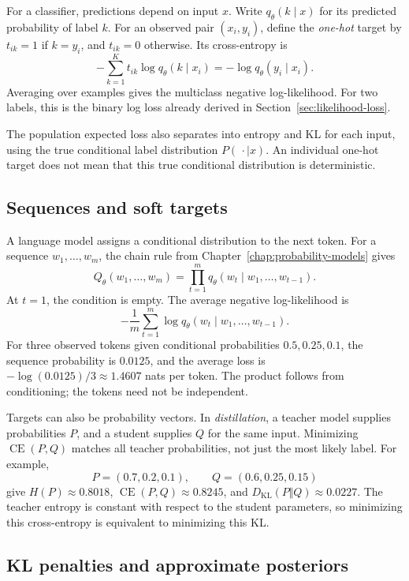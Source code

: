 For a classifier, predictions depend on input \(x\). Write \(q_\theta(k\mid x)\)
for its predicted probability of label \(k\).
For an observed pair \((x_i,y_i)\), define the \emph{one-hot} target by
\(t_{ik}=1\) if \(k=y_i\), and \(t_{ik}=0\) otherwise. Its cross-entropy is
\[
  -\sum_{k=1}^K t_{ik}\log q_\theta(k\mid x_i)
  =-\log q_\theta(y_i\mid x_i).
\]
Averaging over examples gives the multiclass negative log-likelihood.
For two labels, this is the binary log loss already derived in
Section~\ref{sec:likelihood-loss}.

The population expected loss also separates into entropy and KL for each
input, using the true conditional label distribution \(P(\,\cdot\mid x)\).
An individual one-hot target does not mean that this true conditional
distribution is deterministic.

\subsection{Sequences and soft targets}

A language model assigns a conditional distribution to the next token.
For a sequence \(w_1,\ldots,w_m\), the chain rule from
Chapter~\ref{chap:probability-models} gives
\[
  Q_\theta(w_1,\ldots,w_m)
  =\prod_{t=1}^m q_\theta(w_t\mid w_1,\ldots,w_{t-1}).
\]
At \(t=1\), the condition is empty. The average negative log-likelihood is
\[
  -\frac1m\sum_{t=1}^m
    \log q_\theta(w_t\mid w_1,\ldots,w_{t-1}).
\]
For three observed tokens given conditional probabilities
\(0.5,0.25,0.1\), the sequence probability is \(0.0125\), and the
average loss is \(-\log(0.0125)/3\approx1.4607\) nats per token.
The product follows from conditioning; the tokens need not be independent.

Targets can also be probability vectors. In \emph{distillation}, a
teacher model supplies probabilities \(P\), and a student supplies \(Q\)
for the same input. Minimizing \(\operatorname{CE}(P,Q)\) matches all
teacher probabilities, not just the most likely label. For example,
\[
  P=(0.7,0.2,0.1),\qquad Q=(0.6,0.25,0.15)
\]
give \(H(P)\approx0.8018\), \(\operatorname{CE}(P,Q)\approx0.8245\),
and \(D_{\mathrm{KL}}(P\Vert Q)\approx0.0227\).
The teacher entropy is constant with respect to the student parameters,
so minimizing this cross-entropy is equivalent to minimizing this KL.

\subsection{KL penalties and approximate posteriors}

